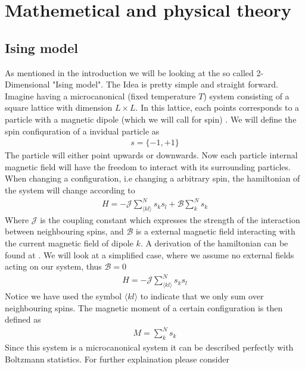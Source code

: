 \documentclass[a4paper, 10pt]{article}
\begin{document}
\section{Mathemetical and physical theory \label{theory section}}
\subsection{Ising model \label{ising model}} As mentioned in the introduction we will be looking at the so called 2-Dimensional
"Ising model". The Idea is pretty simple and straight forward. Imagine having a microcanonical (fixed temperature
$T$) system consisting of a
square lattice with dimension $L\times L$. In this lattice, each points corresponds to a
particle with a magnetic dipole (which we will call for spin) . We will define the spin confiquration of a invidual
particle as
\begin{align}
  s = \{-1, + 1\}
\end{align}
The particle will either point upwards or downwards. Now each particle internal magnetic field will
have the freedom to interact with its surrounding particles. When changing a configuration, i.e
changing a arbitrary spin, the hamiltonian of the system will change
according to
\begin{align}
  H = -\mathcal{J}\sum_{\langle kl \rangle}^{N} s_{k}s_{l} + \mathcal{B}\sum_{k}^{N}s_{k}
\end{align}
Where $\mathcal{J}$ is the coupling constant which expresses the strength of the interaction
between neighbouring spins, and $\mathcal{B}$ is a external magnetic field interacting with
the current magnetic field of dipole $k$. A derivation of the hamiltonian can be found at
\cite{Michael}. We will look at a simplified case, where we assume no
external fields acting on our system, thus $\mathcal{B} = 0$
\begin{align}
  H = -\mathcal{J}\sum_{\langle kl \rangle}^{N} s_{k}s_{l}
  \label{ising energy}
\end{align}
Notice we have used the symbol $\langle kl \rangle$ to indicate that we only sum
over neighbouring spins. The magnetic moment of a certain configuration is then defined as
\begin{align}
    M = \sum_{k}^{N} s_{k}
    \label{ising magnetic}
\end{align}
Since this system is a microcanonical system it can be described perfectly with
Boltzmann statistics. For further explaination please consider \cite{valery}
\end{document}
